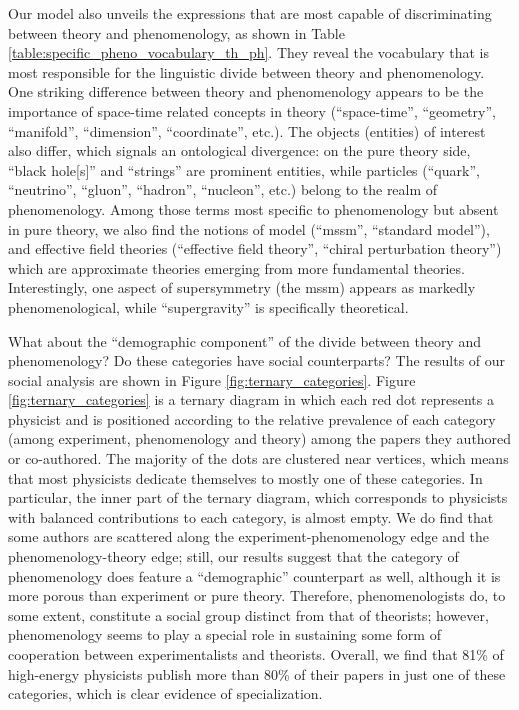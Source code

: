 \documentclass[smallextended]{svjour3}
\begin{document}
Our model also unveils the expressions that are most capable of discriminating between theory and phenomenology, as shown in Table \ref{table:specific_pheno_vocabulary_th_ph}. They reveal the vocabulary that is most responsible for the linguistic divide between theory and phenomenology. One striking difference between theory and phenomenology appears to be the importance of space-time related concepts in theory (``space-time'', ``geometry'',  ``manifold'', ``dimension'', ``coordinate'', etc.). The objects (entities) of interest also differ, which signals an ontological divergence: on the pure theory side, ``black hole[s]'' and ``strings'' are prominent entities, while particles (``quark'', ``neutrino'', ``gluon'', ``hadron'', ``nucleon'', etc.) belong to the realm of phenomenology. Among those terms most specific to phenomenology but absent in pure theory, we also  find the notions of model (``mssm'', ``standard model''), and effective field theories (``effective field theory'', ``chiral perturbation theory'') which are approximate theories emerging from more fundamental theories. Interestingly, one aspect of supersymmetry (the \gls{mssm}) appears as markedly phenomenological, while ``supergravity'' is specifically theoretical.


\setlength\extrarowheight{2pt}


What about the ``demographic component'' of the divide between theory and phenomenology? Do these categories have social counterparts? The results of our social analysis are shown in Figure \ref{fig:ternary_categories}. %
Figure \ref{fig:ternary_categories} is a ternary diagram in which each red dot represents a physicist and is positioned according to the relative prevalence of each category (among experiment, phenomenology and theory) among the papers they authored or co-authored. The majority of the dots are clustered near vertices, which means that most physicists dedicate themselves to mostly one of these categories. In particular, the inner part of the ternary diagram, which corresponds to physicists with balanced contributions to each category, is almost empty. We do find that some authors are scattered along the experiment-phenomenology edge and the phenomenology-theory edge; still, our results suggest that the category of phenomenology does feature a ``demographic'' counterpart as well, although it is more porous than experiment or pure theory. Therefore, phenomenologists do, to some extent, constitute a social group distinct from that of theorists; however, phenomenology seems to play a special role in sustaining some form of cooperation between experimentalists and theorists. Overall, we find that 81\% of high-energy physicists publish more than 80\% of their papers in just one of these categories, which is clear evidence of specialization.
\end{document}
